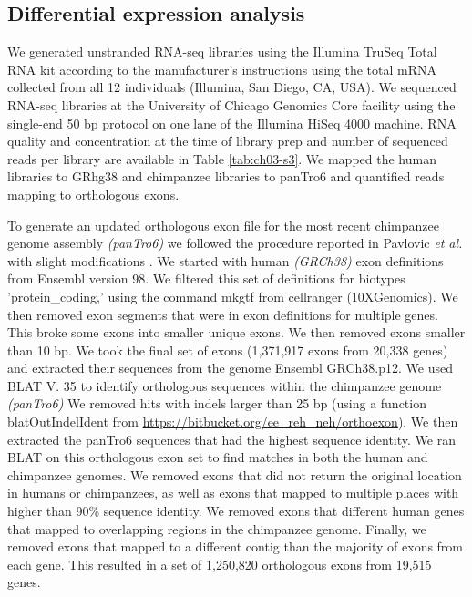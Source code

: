 \subsection{Differential expression analysis}\label{dE} 
 
We generated unstranded RNA-seq libraries using the Illumina TruSeq Total RNA kit according to the manufacturer's instructions using the total mRNA collected from all 12 individuals (Illumina, San Diego, CA, USA). We sequenced RNA-seq libraries at the University of Chicago Genomics Core facility using the single-end 50 bp protocol on one lane of the Illumina HiSeq 4000 machine. RNA quality and concentration at the time of library prep and number of sequenced reads per library are available in  Table \ref{tab:ch03-s3}. We mapped the human libraries to GRhg38 \citep{schneider_evaluation_2017} and chimpanzee libraries to panTro6 \citep{chimpanzee_sequencing_and_analysis_consortium_initial_2005} and quantified reads mapping to orthologous exons. 

To generate an updated orthologous exon file for the most recent chimpanzee genome assembly \emph{(panTro6)} we followed the procedure reported in Pavlovic \emph{et al.} with slight modifications \citep{pavlovic_comparative_2018}. We started with human \emph{(GRCh38)} exon definitions from Ensembl version 98. We filtered this set of definitions for biotypes 'protein\_coding,' using the command mkgtf from cellranger (10XGenomics). We then removed exon segments that were in exon definitions for multiple genes. This broke some exons into smaller unique exons. We then removed exons smaller than 10 bp. We took the final set of exons (1,371,917 exons from 20,338 genes) and extracted their sequences from the genome Ensembl GRCh38.p12. We used BLAT V. 35 to identify orthologous sequences within the chimpanzee genome \emph{(panTro6)} \citep{kent_human_2002} We removed hits with indels larger than 25 bp (using a function blatOutIndelIdent from \url{https://bitbucket.org/ee_reh_neh/orthoexon}). We then extracted the panTro6 sequences that had the highest sequence identity. We ran BLAT on this orthologous exon set to find matches in both the human and chimpanzee genomes. We removed exons that did not return the original location in humans or chimpanzees, as well as exons that mapped to multiple places with higher than 90\% sequence identity. We removed exons that different human genes that mapped to overlapping regions in the chimpanzee genome. Finally, we removed exons that mapped to a different contig than the majority of exons from each gene. This resulted in a set of 1,250,820 orthologous exons from 19,515 genes. 

